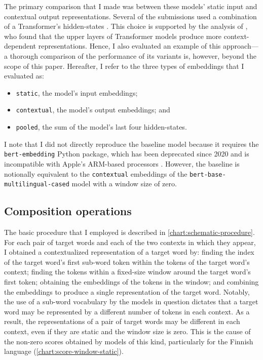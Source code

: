 The primary comparison that I made was between these models' static input and
contextual output representations.
Several of the submissions used a combination of a Transformer's hidden-states
\parencites[e.g.,][276]{Gamallo2020}[61]{CostellaPessutto2020}[145]{Hettiarachchi2020}.
This choice is supported by the analysis of \textcite{Ethayarajh2019}, who found that
the upper layers of Transformer models produce more context-dependent representations.
Hence, I also evaluated an example of this approach—a thorough comparison of the
performance of its variants is, however, beyond the scope of this paper.
Hereafter, I refer to the three types of embeddings that I evaluated as:
\begin{itemize}
  \item \texttt{static}, the model's input embeddings;
  \item \texttt{contextual}, the model's output embeddings; and
  \item \texttt{pooled}, the sum of the model's last four hidden-states.
\end{itemize}

I note that I did not directly reproduce the baseline model because it requires the
\texttt{bert-embedding} Python package, which has been deprecated since 2020 and is
incompatible with Apple's ARM-based processors \parencite{Lai2023}.
However, the baseline is notionally equivalent to the \texttt{contextual} embeddings of
the \texttt{bert-base-multilingual-cased} model with a window size of zero.

\subsection{Composition operations}

The basic procedure that I employed is described in \cref{chart:schematic-procedure}.
For each pair of target words and each of the two contexts in which they appear, I
obtained a contextualized representation of a target word by: finding the index of the
target word's first sub-word token within the tokens of the target word's context;
finding the tokens within a fixed-size window around the target word's first token;
obtaining the embeddings of the tokens in the window; and combining the embeddings to
produce a single representation of the target word.
Notably, the use of a sub-word vocabulary by the models in question
\parencite[e.g.,][4174]{Devlin2019} dictates that a target word may be represented by a
different number of tokens in each context.
As a result, the representations of a pair of target words may be different in each
context, even if they are static and the window size is zero.
This is the cause of the non-zero scores obtained by models of this kind, particularly
for the Finnish language (\cref{chart:score-window-static}).

